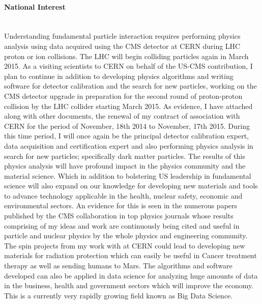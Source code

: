 \documentclass[12pt]{article}
\begin{document}
\paragraph{National Interest} \mbox{}\\
Understanding fundamental particle interaction requires performing physics analysis using data acquired using the CMS detector at CERN during LHC proton or ion collisions. The LHC will begin colliding particles again in March 2015.
As a visiting scientists to CERN on behalf of the US-CMS contribution, I plan to continue in addition to developing physics algorithms and writing software for detector calibration and the search for new particles, working on the CMS detector upgrade in preparation for the second round of proton-proton collision by the LHC collider starting March 2015. As evidence, I have attached along with other documents, the renewal of my contract of association with CERN for the period of November, 18th 2014 to November, 17th 2015. During this time period, I will once again be the principal detector calibration expert, data acquisition and certification expert and also performing physics analysis in search for new particles; specifically dark matter particles. The results of this physics analysis will have profound impact in the physics community and the material science. Which in addition to bolstering US leadership in fundamental science will also expand on our knowledge for developing new materials and tools to advance technology applicable in the health, nuclear safety, economic and environmental sectors. An evidence for this is seen in the numerous papers published by the CMS collaboration in top physics journals whose results comprising of my ideas and work are continuously being cited and useful in particle and nuclear physics by the whole physics and engineering community. The spin projects from my work with at CERN could lead to developing new materials for radiation protection which can easily be useful in Cancer treatment therapy as well as sending humans to Mars. The algorithms and software developed can also be applied in data science for analyzing huge amounts of data in the business, health and government sectors which will improve the economy. This is a currently very rapidly growing field known as Big Data Science.
\end{document}
